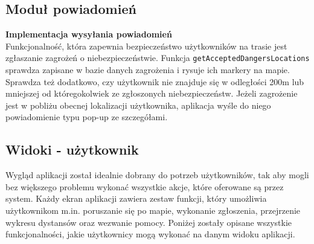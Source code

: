 \subsection{Moduł powiadomień}
\noindent
\textbf{Implementacja wysyłania powiadomień}\\
\indent Funkcjonalność, która zapewnia bezpieczeństwo użytkowników na trasie jest zgłaszanie zagrożeń o niebezpieczeństwie. Funkcja \verb|getAcceptedDangersLocations| sprawdza zapisane w bazie danych zagrożenia i rysuje ich markery na mapie. Sprawdza też dodatkowo, czy użytkownik nie znajduje się w odległości 200m lub mniejszej od któregokolwiek ze zgłoszonych niebezpieczeństw. Jeżeli zagrożenie jest w pobliżu obecnej lokalizacji użytkownika, aplikacja wyśle do niego powiadomienie typu pop-up ze szczegółami. \\
\noindent
\setlength{\fboxrule}{0.5pt}
\begin{minipage}{\linewidth}
    \label{lst:popup}
    \centering
\end{minipage}



\subsection{Widoki - użytkownik}
Wygląd aplikacji został idealnie dobrany do potrzeb użytkowników, tak aby mogli bez większego problemu wykonać wszystkie akcje, które oferowane są przez system. Każdy ekran aplikacji zawiera zestaw funkcji, który umożliwia użytkownikom m.in. poruszanie się po mapie, wykonanie zgłoszenia, przejrzenie wykresu dystansów oraz wezwanie pomocy. Poniżej zostały opisane wszystkie funkcjonalności, jakie użytkownicy mogą wykonać na danym widoku aplikacji.
\\

